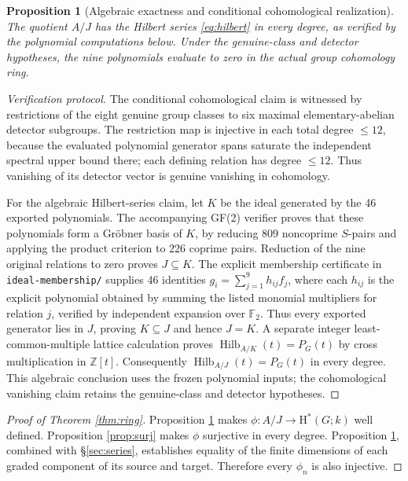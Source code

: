 \documentclass[11pt,a4paper]{article}
\newtheorem{proposition}[theorem]{Proposition}
\theoremstyle{remark}\newtheorem{remark}[theorem]{Remark}
\newcommand{\F}{\mathbb F}
\newcommand{\Z}{\mathbb Z}
\newcommand{\HH}{\mathrm H}
\newcommand{\Hilb}{\operatorname{Hilb}}
\begin{document}
\begin{proposition}[Algebraic exactness and conditional cohomological realization]\label{prop:groebner}
The quotient \(A/J\) has the Hilbert series \eqref{eq:hilbert} in every degree, as verified by the polynomial computations below. Under the genuine-class and detector hypotheses, the nine polynomials evaluate to zero in the actual group cohomology ring.
\end{proposition}
\begin{proof}[Verification protocol]
The conditional cohomological claim is witnessed by restrictions of the eight genuine group classes to six maximal elementary-abelian detector subgroups. The restriction map is injective in each total degree \(\le12\), because the evaluated polynomial generator spans saturate the independent spectral upper bound there; each defining relation has degree \(\le12\). Thus vanishing of its detector vector is genuine vanishing in cohomology.

For the algebraic Hilbert-series claim, let \(K\) be the ideal generated by the 46 exported polynomials. The accompanying GF(2) verifier proves that these polynomials form a Gr\"obner basis of \(K\), by reducing 809 noncoprime \(S\)-pairs and applying the product criterion to 226 coprime pairs. Reduction of the nine original relations to zero proves \(J\subseteq K\). The explicit membership certificate in \texttt{ideal-membership/} supplies 46 identities \(g_i=\sum_{j=1}^{9}h_{ij}f_j\), where each \(h_{ij}\) is the explicit polynomial obtained by summing the listed monomial multipliers for relation \(j\), verified by independent expansion over \(\F_2\). Thus every exported generator lies in \(J\), proving \(K\subseteq J\) and hence \(J=K\). A separate integer least-common-multiple lattice calculation proves \(\Hilb_{A/K}(t)=P_G(t)\) by cross multiplication in \(\Z[t]\). Consequently \(\Hilb_{A/J}(t)=P_G(t)\) in every degree. This algebraic conclusion uses the frozen polynomial inputs; the cohomological vanishing claim retains the genuine-class and detector hypotheses.
\end{proof}

\begin{proof}[Proof of Theorem \ref{thm:ring}]
Proposition \ref{prop:groebner} makes \(\phi:A/J\to\HH^*(G;k)\) well defined. Proposition \ref{prop:surj} makes \(\phi\) surjective in every degree. Proposition \ref{prop:groebner}, combined with \S\ref{sec:series}, establishes equality of the finite dimensions of each graded component of its source and target. Therefore every \(\phi_n\) is also injective.
\end{proof}
\end{document}
